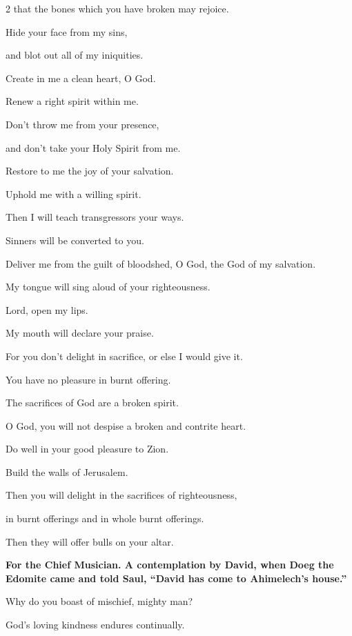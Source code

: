 \begin{multicols}{2}
	that the bones which you have broken may rejoice.
	
	
	\myverse{}Hide your face from my sins,
	
	and blot out all of my iniquities.
	
	
	\myverse{}Create in me a clean heart, O God.
	
	Renew a right spirit within me.
	
	
	\myverse{}Don’t throw me from your presence,
	
	and don’t take your Holy Spirit from me.
	
	
	\myverse{}Restore to me the joy of your salvation.
	
	Uphold me with a willing spirit.
	
	
	\myverse{}Then I will teach transgressors your ways.
	
	Sinners will be converted to you.
	
	
	\myverse{}Deliver me from the guilt of bloodshed, O God, the God of my
	salvation.
	
	My tongue will sing aloud of your righteousness.
	
	
	\myverse{}Lord, open my lips.
	
	My mouth will declare your praise.
	
	
	\myverse{}For you don’t delight in sacrifice, or else I would give it.
	
	You have no pleasure in burnt offering.
	
	
	\myverse{}The sacrifices of God are a broken spirit.
	
	O God, you will not despise a broken and contrite heart.
	
	\vspace{\baselineskip}
	
	\myverse{}Do well in your good pleasure to Zion.
	
	Build the walls of Jerusalem.
	
	
	\myverse{}Then you will delight in the sacrifices of righteousness,
	
	in burnt offerings and in whole burnt offerings.
	
	Then they will offer bulls on your altar.
	
	
	\mychapter{}\textbf{For the Chief Musician. A contemplation by David, when Doeg the Edomite came and told Saul,
		“David has come to Ahimelech’s house.”}
	
	\myverse*{}Why do you boast of mischief, mighty man?
	
	God’s loving kindness endures continually.
	

\end{multicols}
